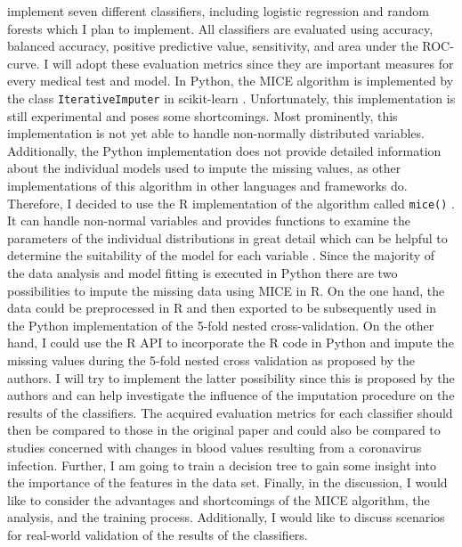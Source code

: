 \documentclass[12pt,a4paper,oneside]{article}
\newcommand{\code}{\texttt}
\newcommand{\comment}[1]{}
\begin{document}
\par
\citeauthor{RN127} implement seven different classifiers, including logistic regression and random forests which I plan to implement. All classifiers are evaluated using accuracy, balanced accuracy, positive predictive value, sensitivity, and area under the ROC-curve. I will adopt these evaluation metrics since they are important measures for every medical test and model.
In Python, the MICE algorithm is implemented by the class \code{IterativeImputer} in scikit-learn \cite{scikit-learn}. Unfortunately, this implementation is still experimental and poses some shortcomings. Most prominently, this implementation is not yet able to handle non-normally distributed variables. Additionally, the Python implementation does not provide detailed information about the individual models used to impute the missing values, as other implementations of this algorithm in other languages and frameworks do. Therefore, I decided to use the R implementation of the algorithm called \code{mice()} \cite{RN135}. It can handle non-normal variables and provides functions to examine the parameters of the individual distributions in great detail which can be helpful to determine the suitability of the model for each variable \cite{RN142}. Since the majority of the data analysis and model fitting is executed in Python there are two possibilities to impute the missing data using MICE in R. On the one hand, the data could be preprocessed in R and then exported to be subsequently used in the Python implementation of the 5-fold nested cross-validation. 
On the other hand, I could use the R API to incorporate the R code in Python and impute the missing values during the 5-fold nested cross validation as proposed by the authors. I will try to implement the latter possibility since this is proposed by the authors and can help investigate the influence of the imputation procedure on the results of the classifiers.
The acquired evaluation metrics for each classifier should then be compared to those in the original paper and could also be compared to studies concerned with changes in blood values resulting from a coronavirus infection. Further, I am going to train a decision tree to gain some insight into the importance of the features in the data set. Finally, in the discussion, I would like to consider the advantages and shortcomings of the MICE algorithm, the analysis, and the training process. Additionally, I would like to discuss scenarios for real-world validation of the results of the classifiers.
\comment{
Additionally, I could discuss further ideas, such as the potential benefits and pitfalls of bootstrapping data using the original data set to improve the performance of the classifiers and scenarios for a real-world validation of the results.}
\printbibliography
\end{document}
